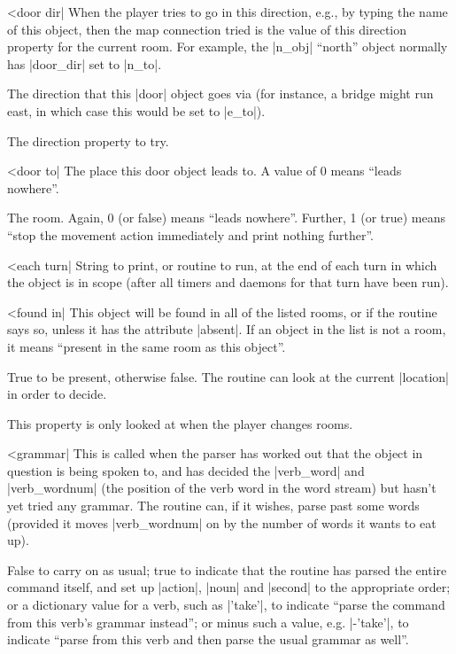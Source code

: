 \nrr

^^|door dir|
\fco When the player tries to go in this direction, e.g., by typing the
name of this object, then the map connection tried is the value of
this direction property for the current room.  For example, the
|n_obj| ``north'' object normally has |door_dir| set to |n_to|.

\fo The direction that this |door| object goes via (for instance,
a bridge might run east, in which case this would be set to |e_to|).

\rr The direction property to try.

^^|door to|
\fo The place this door object leads to.  A value of 0 means
``leads nowhere''.

\rr The room.  Again, 0 (or false) means ``leads nowhere''.
Further, 1 (or true) means ``stop the movement action immediately
and print nothing further''.

^^|each turn|
String to print, or routine to run, at the end of each turn in which
the object is in scope (after all timers and daemons for that turn have
been run).

\nrr

^^|found in|
This object will be found in all of the listed rooms, or if
the routine says so, unless it has the attribute |absent|.  If
an object in the list is not a room, it means ``present in the
same room as this object''.

\rr True to be present, otherwise false.  The routine can look
at the current |location| in order to decide.

\warn This property is only looked at when the player changes rooms.

^^|grammar|
\fato  This is called when the
parser has worked out that the object in question is being spoken
to, and has decided the |verb_word| and |verb_wordnum| (the position
of the verb word in the word stream) but hasn't yet tried any grammar.
The routine can, if it wishes, parse past some words (provided it
moves |verb_wordnum| on by the number of words it wants to eat up).

\rr  False to carry on as usual; true to indicate that the routine
has parsed the entire command itself, and set up |action|, |noun|
and |second| to the appropriate order; or a dictionary value for
a verb, such as |'take'|, to indicate ``parse the command from this
verb's grammar instead''; or minus such a value, e.g. |-'take'|,
to indicate ``parse from this verb and then parse the usual
grammar as well''.

